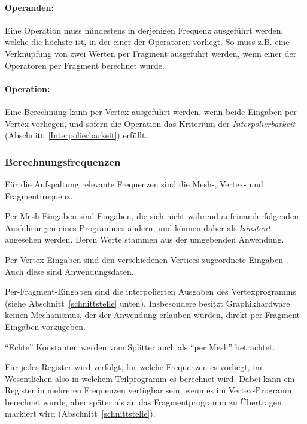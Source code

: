 \documentclass[twoside,a4paper,fleqn,12pt]{article}
\begin{document}
\paragraph{Operanden:} Eine Operation muss mindestens in derjenigen Frequenz ausgeführt werden, welche die höchste ist, in der einer der Operatoren
vorliegt. So muss z.B. eine Verknüpfung von zwei Werten per Fragment ausgeführt werden, wenn einer der Operatoren per Fragment berechnet wurde.

\paragraph{Operation:} Eine Berechnung kann per Vertex ausgeführt werden, wenn beide Eingaben per Vertex vorliegen, und
sofern die Operation das Kriterium der \emph{Interpolierbarkeit} (Abschnitt~\ref{Interpolierbarkeit}) erfüllt.

\subsubsection{Berechnungsfrequenzen}

Für die Aufspaltung relevante Frequenzen sind die Mesh-, %
Vertex- und Fragmentfrequenz.

Per-Mesh-Eingaben sind Eingaben, die sich nicht während aufeinanderfolgenden Ausführungen eines Programmes
ändern, und können daher als \emph{konstant} angesehen werden. Deren Werte stammen aus der umgebenden Anwendung.

Per-Vertex-Eingaben sind den verschiedenen Vertices zugeordnete Eingaben . %
Auch diese sind Anwendungsdaten.

Per-Fragment-Eingaben sind die interpolierten Ausgaben des Vertexprogramms (siehe Abschnitt~\ref{schnittstelle} unten). 
Insbesondere besitzt Graphikhardware keinen Mechanismus, der der Anwendung erlauben würden, direkt per-Fragment-Eingaben
vorzugeben.

"`Echte"' Konstanten werden vom Splitter auch als "`per Mesh"' betrachtet.

Für jedes Register wird verfolgt, für welche Frequenzen es vorliegt, im Wesentlichen also in welchem Teilprogramm es berechnet wird.
Dabei kann ein Register in mehreren Frequenzen verfügbar sein, wenn es im Vertex-Programm berechnet wurde, aber später als
an das Fragmentprogramm zu Übertragen markiert wird (Abschnitt~\ref{schnittstelle}).
\end{document}
